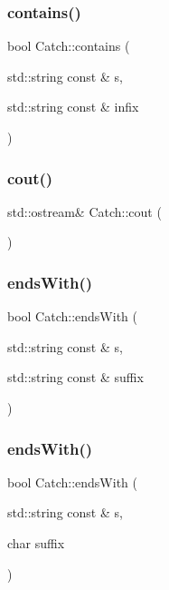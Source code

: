 \mbox{\label{namespace_catch_aa52974b0e426e7e2fbd725a900e9c36e}} 
\subsubsection{contains()}
{\footnotesize\ttfamily bool Catch\+::contains (\begin{DoxyParamCaption}\item[{std\+::string const \&}]{s,  }\item[{std\+::string const \&}]{infix }\end{DoxyParamCaption})}

\mbox{\label{namespace_catch_a50af73c5a37ad5c6558df4ce4a275e83}} 
\subsubsection{cout()}
{\footnotesize\ttfamily std\+::ostream\& Catch\+::cout (\begin{DoxyParamCaption}{ }\end{DoxyParamCaption})}

\mbox{\label{namespace_catch_ada025504f627feaf9ac68ca391515dff}} 
\subsubsection{endsWith()\hspace{0.1cm}{\footnotesize\ttfamily [1/2]}}
{\footnotesize\ttfamily bool Catch\+::ends\+With (\begin{DoxyParamCaption}\item[{std\+::string const \&}]{s,  }\item[{std\+::string const \&}]{suffix }\end{DoxyParamCaption})}

\mbox{\label{namespace_catch_afd801a3e33fd7a8b91ded0d02747a93f}} 
\subsubsection{endsWith()\hspace{0.1cm}{\footnotesize\ttfamily [2/2]}}
{\footnotesize\ttfamily bool Catch\+::ends\+With (\begin{DoxyParamCaption}\item[{std\+::string const \&}]{s,  }\item[{char}]{suffix }\end{DoxyParamCaption})}

